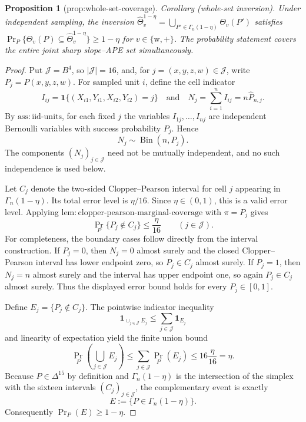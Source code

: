 \documentclass{article}
\newtheorem{proposition}{Proposition}
\begin{document}
\begin{proposition}[prop:whole-set-coverage]\label{prop:whole-set-coverage}
Corollary (whole-set inversion). Under independent sampling, the inversion \(\widehat\Theta_v^{1-\eta}=\bigcup_{P'\in\Gamma_n(1-\eta)}\Theta_v(P')\) satisfies \(\Pr_P\{\Theta_v(P)\subseteq\widehat\Theta_v^{1-\eta}\}\ge1-\eta\) for \(v\in\{\mathrm w,+\}\). The probability statement covers the entire joint sharp slope--APE set simultaneously.
\end{proposition}
\begin{proof}
Put \(\mathcal J=B^4\), so \(|\mathcal J|=16\), and, for \(j=(x,y,z,w)\in\mathcal J\), write \(P_j=P(x,y,z,w)\).  For sampled unit \(i\), define the cell indicator
\[
 I_{ij}=\mathbf 1\{(X_{i1},Y_{i1},X_{i2},Y_{i2})=j\}
\quad\text{and}\quad
 N_j=\sum_{i=1}^n I_{ij}=n\widehat P_{n,j}.
\]
By \(\mathrm{ass{:}iid\text{-}units}\), for each fixed \(j\) the variables \(I_{1j},\ldots,I_{nj}\) are independent Bernoulli variables with success probability \(P_j\).  Hence
\[
 N_j\sim\operatorname{Bin}(n,P_j).
\]
The components \((N_j)_{j\in\mathcal J}\) need not be mutually independent, and no such independence is used below.

Let \(C_j\) denote the two-sided Clopper--Pearson interval for cell \(j\) appearing in \(\Gamma_n(1-\eta)\).  Its total error level is \(\eta/16\).  Since \(\eta\in(0,1)\), this is a valid error level.  Applying \(\mathrm{lem{:}clopper\text{-}pearson\text{-}marginal\text{-}coverage}\) with \(\pi=P_j\) gives
\[
 \Pr_P\{P_j\notin C_j\}\leq \frac{\eta}{16}
 \qquad(j\in\mathcal J).
\]
For completeness, the boundary cases follow directly from the interval construction.  If \(P_j=0\), then \(N_j=0\) almost surely and the closed Clopper--Pearson interval has lower endpoint zero, so \(P_j\in C_j\) almost surely.  If \(P_j=1\), then \(N_j=n\) almost surely and the interval has upper endpoint one, so again \(P_j\in C_j\) almost surely.  Thus the displayed error bound holds for every \(P_j\in[0,1]\).

Define \(E_j=\{P_j\notin C_j\}\).  The pointwise indicator inequality
\[
 \mathbf 1_{\cup_{j\in\mathcal J}E_j}
 \leq
 \sum_{j\in\mathcal J}\mathbf 1_{E_j}
\]
and linearity of expectation yield the finite union bound
\[
 \Pr_P\!\left(\bigcup_{j\in\mathcal J}E_j\right)
 \leq
 \sum_{j\in\mathcal J}\Pr_P(E_j)
 \leq
 16\frac{\eta}{16}=\eta.
\]
Because \(P\in\Delta^{15}\) by definition and \(\Gamma_n(1-\eta)\) is the intersection of the simplex with the sixteen intervals \((C_j)_{j\in\mathcal J}\), the complementary event is exactly
\[
 E:=\{P\in\Gamma_n(1-\eta)\}.
\]
Consequently \(\Pr_P(E)\geq1-\eta\).


\end{proof}
\end{document}
